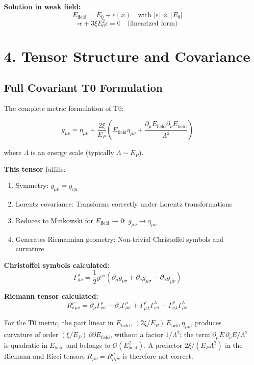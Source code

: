	\textbf{Solution in weak field:}
	\[
	E_{\text{field}} = E_0 + \epsilon(x) \quad \text{with } |\epsilon| \ll |E_0|
	\]
	\[
	\square \epsilon + 3\xi E_0^2 \epsilon = 0 \quad \text{(linearized form)}
	\]
	
	\section*{4. Tensor Structure and Covariance}
	
	\subsection*{\textbf{Full Covariant T0 Formulation}}
	
	The complete metric formulation of T0:
	
	\[
	g_{\mu\nu} = \eta_{\mu\nu} + \frac{2\xi}{E_P} \left(E_{\text{field}} \eta_{\mu\nu} + \frac{\partial_\mu E_{\text{field}} \partial_\nu E_{\text{field}}}{\Lambda^2}\right)
	\]
	
	where $\Lambda$ is an energy scale (typically $\Lambda \sim E_P$).
	
	\textbf{This tensor} fulfills:
	\begin{enumerate}[label=\checkmark]
		\item Symmetry: $g_{\mu\nu} = g_{\nu\mu}$
		\item Lorentz covariance: Transforms correctly under Lorentz transformations
		\item Reduces to Minkowski for $E_{\text{field}} \to 0$: $g_{\mu\nu} \to \eta_{\mu\nu}$
		\item Generates Riemannian geometry: Non-trivial Christoffel symbols and curvature
	\end{enumerate}
	
	\textbf{Christoffel symbols calculated:}
	\[
	\Gamma^\rho_{\mu\nu} = \frac{1}{2} g^{\rho\sigma} (\partial_\mu g_{\nu\sigma} + \partial_\nu g_{\mu\sigma} - \partial_\sigma g_{\mu\nu})
	\]
	
	\textbf{Riemann tensor calculated:}
	\[
	R^\rho_{\sigma\mu\nu} = \partial_\mu \Gamma^\rho_{\nu\sigma} - \partial_\nu \Gamma^\rho_{\mu\sigma} + \Gamma^\rho_{\mu\lambda} \Gamma^\lambda_{\nu\sigma} - \Gamma^\rho_{\nu\lambda} \Gamma^\lambda_{\mu\sigma}
	\]
	
	For the T0 metric, the part linear in $E_{\text{field}}$, $(2\xi/E_P)\,E_{\text{field}}\,\eta_{\mu\nu}$, produces curvature of order $(\xi/E_P)\,\partial\partial E_{\text{field}}$, without a factor $1/\Lambda^2$; the term $\partial_\mu E\,\partial_\nu E/\Lambda^2$ is quadratic in $E_{\text{field}}$ and belongs to $\mathcal{O}(E_{\text{field}}^2)$. A prefactor $2\xi/(E_P\Lambda^2)$ in the Riemann and Ricci tensors $R_{\mu\nu} = R^\rho_{\mu\rho\nu}$ is therefore not correct.
	
